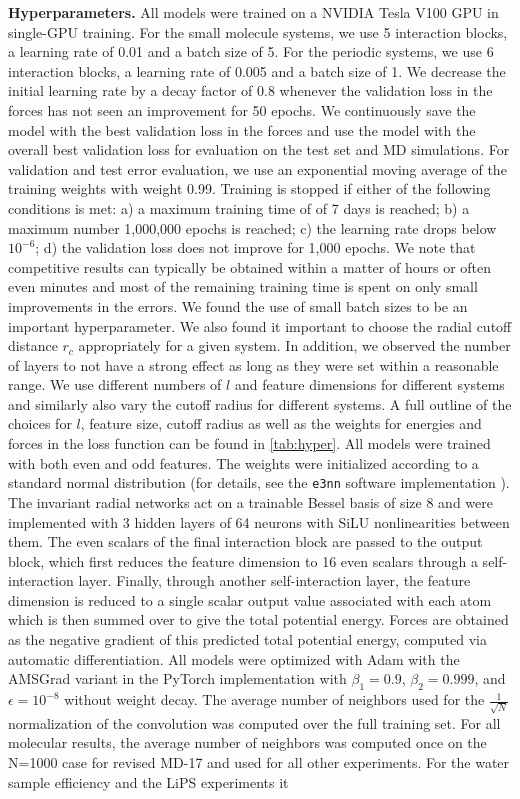 \documentclass[%
reprint,
superscriptaddress,
nofootinbib,
amsmath,amssymb,
aps,
prl,
]{revtex4-1}
\begin{document}
\textbf{Hyperparameters.} All models were trained on a NVIDIA Tesla V100 GPU in single-GPU training. For the small molecule systems, we use 5 interaction blocks, a learning rate of 0.01 and a batch size of 5. For the periodic systems, we use 6 interaction blocks, a learning rate of 0.005 and a batch size of 1.  We decrease the initial learning rate by a decay factor of 0.8 whenever the validation loss in the forces has not seen an improvement for 50 epochs. We continuously save the model with the best validation loss in the forces and use the model with the overall best validation loss for evaluation on the test set and MD simulations. For validation and test error evaluation, we use an exponential moving average of the training weights with weight 0.99. Training is stopped if either of the following conditions is met: a) a maximum training time of of 7 days is reached; b) a maximum number 1,000,000 epochs is reached; c) the learning rate drops below $10^{-6}$; d) the validation loss does not improve for 1,000 epochs. We note that competitive results can typically be obtained within a matter of hours or often even minutes and most of the remaining training time is spent on only small improvements in the errors. We found the use of small batch sizes to be an important hyperparameter. We also found it important to choose the radial cutoff distance $r_c$ appropriately for a given system. In addition, we observed the number of layers to not have a strong effect as long as they were set within a reasonable range. We use different numbers of $l$ and feature dimensions for different systems and similarly also vary the cutoff radius for different systems. A full outline of the choices for $l$, feature size, cutoff radius as well as the weights for energies and forces in the loss function can be found in \ref{tab:hyper}. All models were trained with both even and odd features. The weights were initialized according to a standard normal distribution (for details, see the \texttt{e3nn} software implementation \cite{mario_geiger_2021_4735637}). The invariant radial networks act on a trainable Bessel basis of size 8 and were implemented with 3 hidden layers of 64 neurons with SiLU nonlinearities between them. The even scalars of the final interaction block are passed to the output block, which  first reduces the feature dimension to 16 even scalars through a self-interaction layer. Finally, through another self-interaction layer, the feature dimension is reduced to a single scalar output value associated with each atom which is then summed over to give the total potential energy. Forces are obtained as the negative gradient of this predicted total potential energy, computed via automatic differentiation. All models were optimized with Adam with the AMSGrad variant in the PyTorch implementation \cite{kingma2014adam, loshchilov2017decoupled, reddi2019convergence} with $\beta_1=0.9$, $\beta_2=0.999$, and $\epsilon=10^{-8}$ without weight decay. The average number of neighbors used for the $\frac{1}{\sqrt{N}}$ normalization of the convolution was computed over the full training set. For all molecular results, the average number of neighbors was computed once on the N=1000 case for revised MD-17 and used for all other experiments. For the water sample efficiency and the LiPS experiments it 
\end{document}
